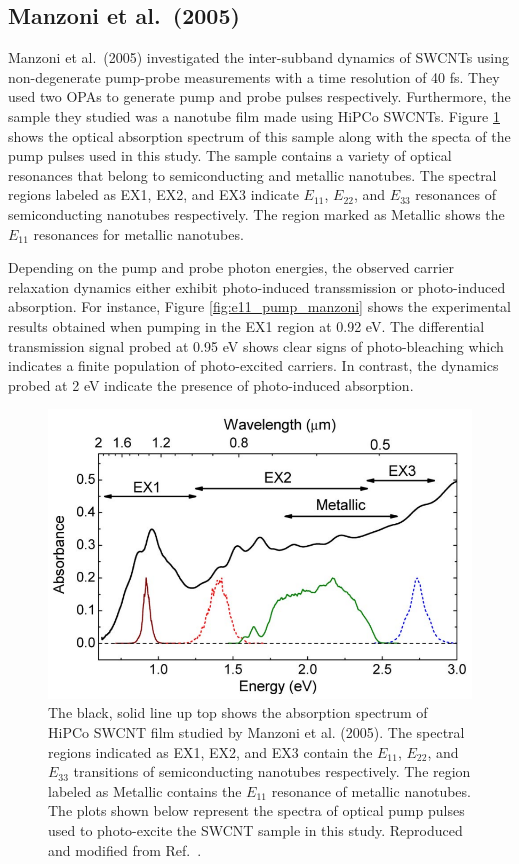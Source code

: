 \subsection{Manzoni et al.\ (2005)}
Manzoni et al.\ (2005) investigated the inter-subband dynamics of SWCNTs using non-degenerate pump-probe measurements with a time resolution of 40 fs. They used two OPAs to generate pump and probe pulses respectively. Furthermore, the sample they studied was a nanotube film made using HiPCo SWCNTs. Figure \ref{fig:abs_manzoni} shows the optical absorption spectrum of this sample along with the specta of the pump pulses used in this study. The sample contains a variety of optical resonances that belong to semiconducting and metallic nanotubes. The spectral regions labeled as EX1, EX2, and EX3 indicate $E_{11}$, $E_{22}$, and $E_{33}$ resonances of semiconducting nanotubes respectively. The region marked as Metallic shows the $E_{11}$ resonances for metallic nanotubes.

Depending on the pump and probe photon energies, the observed carrier relaxation dynamics either exhibit photo-induced transsmission or photo-induced absorption. For instance, Figure \ref{fig:e11_pump_manzoni} shows the experimental results obtained when pumping in the EX1 region at 0.92 eV. The differential transmission signal probed at 0.95 eV shows clear signs of photo-bleaching which indicates a finite population of photo-excited carriers. In contrast, the dynamics probed at 2 eV indicate the presence of photo-induced absorption.

\begin{figure}[H]
	\centering
	\includegraphics[scale=0.4]{images/chapter_prior_works/abs_manzoni}
	\caption{The black, solid line up top shows the absorption spectrum of HiPCo SWCNT film studied by Manzoni et al. (2005). The spectral regions indicated as EX1, EX2, and EX3 contain the $E_{11}$, $E_{22}$, and $E_{33}$ transitions of semiconducting nanotubes respectively. The region labeled as Metallic contains the $E_{11}$ resonance of metallic nanotubes. The plots shown below represent the spectra of optical pump pulses used to photo-excite the SWCNT sample in this study. Reproduced and modified from Ref.\ \cite{manzoni2005intersubband}.}
	\label{fig:abs_manzoni}
\end{figure}

